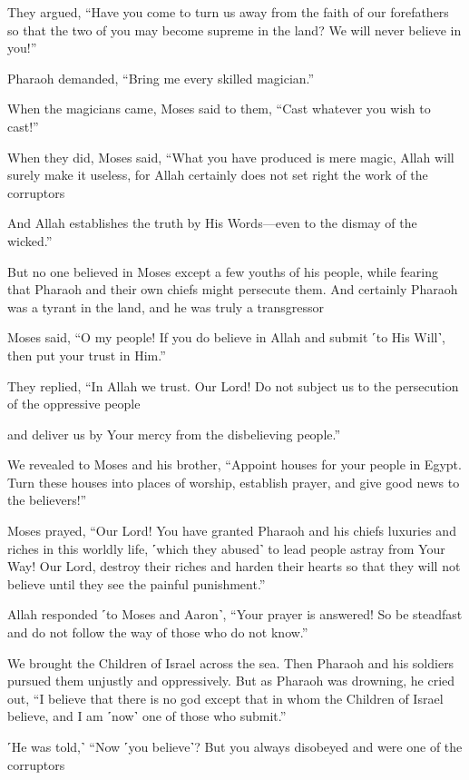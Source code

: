 They argued, “Have you come to turn us away from the faith of our forefathers so that the two of you may become supreme in the land? We will never believe in you!”

Pharaoh demanded, “Bring me every skilled magician.”

When the magicians came, Moses said to them, “Cast whatever you wish to cast!”

When they did, Moses said, “What you have produced is mere magic, Allah will surely make it useless, for Allah certainly does not set right the work of the corruptors

And Allah establishes the truth by His Words—even to the dismay of the wicked.”

But no one believed in Moses except a few youths of his people, while fearing that Pharaoh and their own chiefs might persecute them. And certainly Pharaoh was a tyrant in the land, and he was truly a transgressor

Moses said, “O my people! If you do believe in Allah and submit ˹to His Will˺, then put your trust in Him.”

They replied, “In Allah we trust. Our Lord! Do not subject us to the persecution of the oppressive people

and deliver us by Your mercy from the disbelieving people.”

We revealed to Moses and his brother, “Appoint houses for your people in Egypt. Turn these houses into places of worship, establish prayer, and give good news to the believers!”

Moses prayed, “Our Lord! You have granted Pharaoh and his chiefs luxuries and riches in this worldly life, ˹which they abused˺ to lead people astray from Your Way! Our Lord, destroy their riches and harden their hearts so that they will not believe until they see the painful punishment.”

Allah responded ˹to Moses and Aaron˺, “Your prayer is answered! So be steadfast and do not follow the way of those who do not know.”

We brought the Children of Israel across the sea. Then Pharaoh and his soldiers pursued them unjustly and oppressively. But as Pharaoh was drowning, he cried out, “I believe that there is no god except that in whom the Children of Israel believe, and I am ˹now˺ one of those who submit.”

˹He was told,˺ “Now ˹you believe˺? But you always disobeyed and were one of the corruptors

